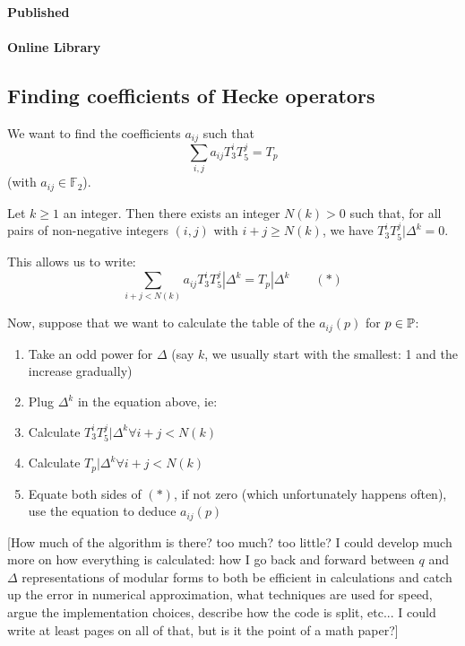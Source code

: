 \paragraph{Published}

\paragraph{Online Library}





\subsection{Finding coefficients of Hecke operators}

We want to find the coefficients $a_{ij}$ such that $$\sum_{i, j} a_{ij} T_3^iT_5^j = T_p$$
(with $a_{ij} \in \mathbb{F}_2$).

Let $k\geq 1$ an integer.
Then there exists an integer $N(k)>0$ such that,
for all pairs of non-negative integers $(i, j)$ with $i+j \geq N(k)$,
we have $T_3^{i}T_5^{j}|\Delta^k = 0$.

This allows us to write:
$$\sum_{i+j < N(k)} a_{ij} T_3^iT_5^j|\Delta^k= T_p|\Delta^k \qquad (*)$$

Now, suppose that we want to calculate the table of the $a_{ij}(p)$ for $p \in \mathbb{P}$:
\begin{enumerate}
    \item Take an odd power for $\Delta$ (say $k$, we usually start with the smallest: 1 and the increase gradually)
    \item Plug $\Delta^k$ in the equation above, ie:
    \item Calculate $T_3^iT_5^j|\Delta^k \forall i+j < N(k)$
    \item Calculate $T_p|\Delta^k \forall i+j < N(k)$
    \item Equate both sides of $(*)$, if not zero (which unfortunately happens often), use the equation to deduce $a_{ij}(p)$
\end{enumerate}

[How much of the algorithm is there? too much? too little? I could develop much more on how everything is calculated: how I go back and forward between $q$ and $\Delta$ representations of modular forms to both be efficient in calculations and catch up the error in numerical approximation, what techniques are used for speed, argue the implementation choices, describe how the code is split, etc... I could write at least  pages on all of that, but is it the point of a math paper?]
